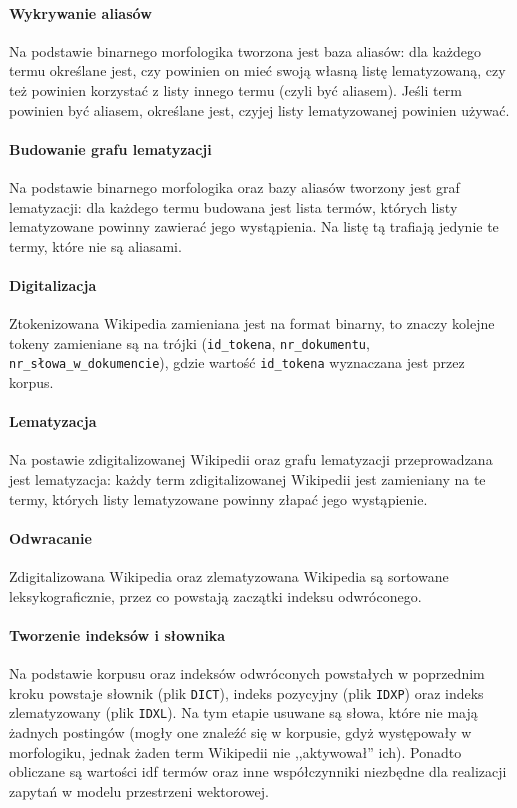 \documentclass[a4paper,12pt]{article}
\begin{document}
\paragraph{Wykrywanie aliasów} Na podstawie binarnego morfologika tworzona
jest baza aliasów: dla każdego termu określane jest, czy powinien on mieć
swoją własną listę lematyzowaną, czy też powinien korzystać z listy innego
termu (czyli być aliasem). Jeśli term powinien być aliasem, określane jest,
czyjej listy lematyzowanej powinien używać.

\paragraph{Budowanie grafu lematyzacji} Na podstawie binarnego morfologika
oraz bazy aliasów tworzony jest graf lematyzacji: dla każdego termu budowana
jest lista termów, których listy lematyzowane powinny zawierać jego
wystąpienia. Na listę tą trafiają jedynie te termy, które nie są aliasami.

\paragraph{Digitalizacja} Ztokenizowana Wikipedia zamieniana jest na format
binarny, to znaczy kolejne tokeny zamieniane są na trójki (\texttt{id\_tokena},
\texttt{nr\_dokumentu}, \texttt{nr\_słowa\_w\_dokumencie}), gdzie wartość
\texttt{id\_tokena} wyznaczana jest przez korpus.

\paragraph{Lematyzacja} Na postawie zdigitalizowanej Wikipedii oraz grafu
lematyzacji przeprowadzana jest lematyzacja: każdy term zdigitalizowanej
Wikipedii jest zamieniany na te termy, których listy lematyzowane powinny
złapać jego wystąpienie.

\paragraph{Odwracanie} Zdigitalizowana Wikipedia oraz zlematyzowana Wikipedia
są sortowane leksykograficznie, przez co powstają zaczątki indeksu odwróconego.

\paragraph{Tworzenie indeksów i słownika} Na podstawie korpusu oraz indeksów
odwróconych powstałych w poprzednim kroku powstaje słownik (plik
\texttt{DICT}), indeks pozycyjny (plik \texttt{IDXP}) oraz indeks zlematyzowany
(plik \texttt{IDXL}). Na tym etapie usuwane są słowa, które nie mają żadnych
postingów (mogły one znaleźć się w korpusie, gdyż występowały w morfologiku,
jednak żaden term Wikipedii nie ,,aktywował'' ich). Ponadto obliczane są
wartości idf termów oraz inne współczynniki niezbędne dla realizacji zapytań w
modelu przestrzeni wektorowej.
\end{document}
